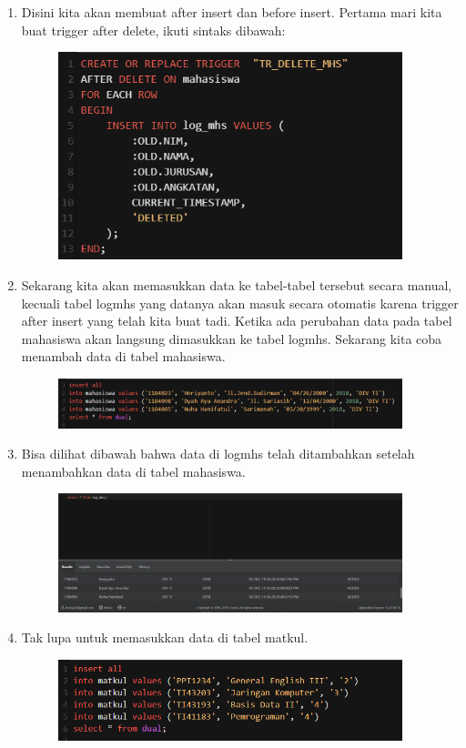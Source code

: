 \documentclass[12pt, times new roman]{article}
\begin{document}
\begin{enumerate}
\item Disini kita akan membuat after insert dan before insert. Pertama mari kita buat trigger after delete, ikuti sintaks dibawah:
\begin{figure}[!htbp]
	\centering
	\includegraphics[width=10cm]{figures/8.png}
\end{figure}
\item Sekarang kita akan memasukkan data ke tabel-tabel tersebut secara manual, kecuali tabel logmhs yang datanya akan masuk secara otomatis karena trigger after insert yang telah kita buat tadi. Ketika ada perubahan data pada tabel mahasiswa akan langsung dimasukkan ke tabel logmhs. Sekarang kita coba menambah data di tabel mahasiswa.
\begin{figure}[!htbp]
	\centering
	\includegraphics[width=10cm]{figures/5.png}
\end{figure}
\item Bisa dilihat dibawah bahwa data di logmhs telah ditambahkan setelah menambahkan data di tabel mahasiswa.
\begin{figure}[!htbp]
	\centering
	\includegraphics[width=10cm]{figures/20.png}
\end{figure}
\item Tak lupa untuk memasukkan data di tabel matkul.
\begin{figure}[!htbp]
	\centering
	\includegraphics[width=10cm]{figures/6.png}

\end{figure}
\end{enumerate}
\end{document}
